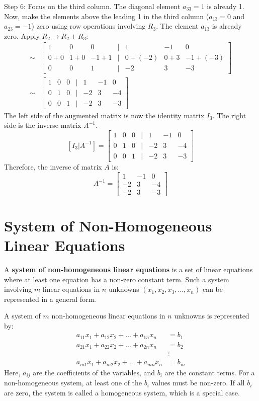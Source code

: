 \documentclass{article}
\begin{document}
Step 6: Focus on the third column. The diagonal element $a_{33}=1$ is already 1. Now, make the elements above the leading 1 in the third column ($a_{13}=0$ and $a_{23}=-1$) zero using row operations involving $R_3$. The element $a_{13}$ is already zero.
Apply $R_2 \to R_2 + R_3$:
\begin{align*} \sim &\begin{bmatrix} 1 & 0 & 0 & | & 1 & -1 & 0 \\ 0 + 0 & 1 + 0 & -1 + 1 & | & 0 + (-2) & 0 + 3 & -1 + (-3) \\ 0 & 0 & 1 & | & -2 & 3 & -3 \end{bmatrix} \\ \sim &\begin{bmatrix} 1 & 0 & 0 & | & 1 & -1 & 0 \\ 0 & 1 & 0 & | & -2 & 3 & -4 \\ 0 & 0 & 1 & | & -2 & 3 & -3 \end{bmatrix}\end{align*}
The left side of the augmented matrix is now the identity matrix $I_3$. The right side is the inverse matrix $A^{-1}$.
\[ [I_3 | A^{-1}] = \begin{bmatrix} 1 & 0 & 0 & | & 1 & -1 & 0 \\ 0 & 1 & 0 & | & -2 & 3 & -4 \\ 0 & 0 & 1 & | & -2 & 3 & -3 \end{bmatrix} \]
Therefore, the inverse of matrix $A$ is:
\[ A^{-1} = \begin{bmatrix} 1 & -1 & 0 \\ -2 & 3 & -4 \\ -2 & 3 & -3 \end{bmatrix} \]

\section{System of Non-Homogeneous Linear Equations} %

A \textbf{system of non-homogeneous linear equations} is a set of linear equations where at least one equation has a non-zero constant term. Such a system involving $m$ linear equations in $n$ unknowns $(x_1, x_2, x_3, \dots, x_n)$ can be represented in a general form.

A system of $m$ non-homogeneous linear equations in $n$ unknowns is represented by:
\begin{align*} a_{11} x_1 + a_{12} x_2 + \dots + a_{1n} x_n &= b_1 \\ a_{21} x_1 + a_{22} x_2 + \dots + a_{2n} x_n &= b_2 \\ &\vdots \\ a_{m1} x_1 + a_{m2} x_2 + \dots + a_{mn} x_n &= b_m \end{align*}
Here, $a_{ij}$ are the coefficients of the variables, and $b_i$ are the constant terms. For a non-homogeneous system, at least one of the $b_i$ values must be non-zero. If all $b_i$ are zero, the system is called a homogeneous system, which is a special case.
\end{document}
